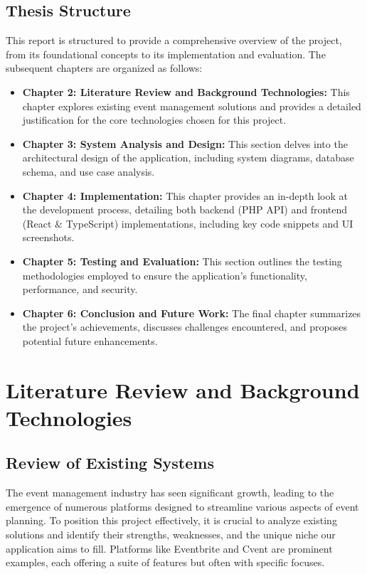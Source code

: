 \documentclass{report}
\begin{document}
\section{Thesis Structure}
\label{sec:thesis_structure}
This report is structured to provide a comprehensive overview of the project, from its foundational concepts to its implementation and evaluation. The subsequent chapters are organized as follows:
\begin{itemize}
    \item \textbf{Chapter 2: Literature Review and Background Technologies:} This chapter explores existing event management solutions and provides a detailed justification for the core technologies chosen for this project.
    \item \textbf{Chapter 3: System Analysis and Design:} This section delves into the architectural design of the application, including system diagrams, database schema, and use case analysis.
    \item \textbf{Chapter 4: Implementation:} This chapter provides an in-depth look at the development process, detailing both backend (PHP API) and frontend (React \& TypeScript) implementations, including key code snippets and UI screenshots.
    \item \textbf{Chapter 5: Testing and Evaluation:} This section outlines the testing methodologies employed to ensure the application's functionality, performance, and security.
    \item \textbf{Chapter 6: Conclusion and Future Work:} The final chapter summarizes the project's achievements, discusses challenges encountered, and proposes potential future enhancements.
\end{itemize}

\chapter{Literature Review and Background Technologies}
\label{chap:literature_review}

\section{Review of Existing Systems}
\label{sec:review_existing_systems}
The event management industry has seen significant growth, leading to the emergence of numerous platforms designed to streamline various aspects of event planning. To position this project effectively, it is crucial to analyze existing solutions and identify their strengths, weaknesses, and the unique niche our application aims to fill. Platforms like Eventbrite and Cvent are prominent examples, each offering a suite of features but often with specific focuses.
\end{document}

